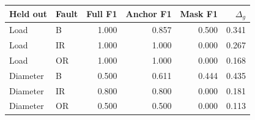 \begin{tabular}{llrrrr}
\toprule
Held out & Fault & Full F1 & Anchor F1 & Mask F1 & $\Delta_g$ \\
\midrule
Load & B & 1.000 & 0.857 & 0.500 & 0.341 \\
Load & IR & 1.000 & 1.000 & 0.000 & 0.267 \\
Load & OR & 1.000 & 1.000 & 0.000 & 0.168 \\
Diameter & B & 0.500 & 0.611 & 0.444 & 0.435 \\
Diameter & IR & 0.800 & 0.800 & 0.000 & 0.181 \\
Diameter & OR & 0.500 & 0.500 & 0.000 & 0.113 \\
\bottomrule
\end{tabular}
